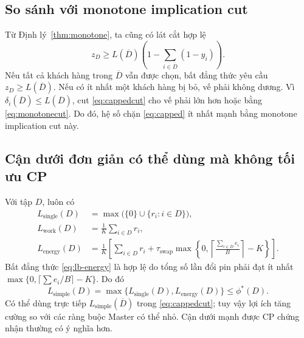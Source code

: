 \documentclass[11pt,a4paper]{article}
\theoremstyle{definition}
\theoremstyle{plain}
\theoremstyle{remark}
\newcommand{\sw}{\tau_{\mathrm{swap}}}
\newcommand{\opt}{\phi^*}
\newcommand{\barD}{\overline D}
\begin{document}
\subsection{So sánh với monotone implication cut}
Từ Định lý~\ref{thm:monotone}, ta cũng có lát cắt hợp lệ
\begin{equation}\label{eq:monotonecut}
z_D\ge L(\barD)\left(1-\sum_{i\in\barD}(1-y_i)\right).
\end{equation}
Nếu tất cả khách hàng trong $\barD$ vẫn được chọn, bất đẳng thức yêu cầu $z_D\ge L(\barD)$. Nếu có ít nhất một khách hàng bị bỏ, vế phải không dương. Vì $\delta_i(\barD)\le L(\barD)$, cut \eqref{eq:cappedcut} cho vế phải lớn hơn hoặc bằng \eqref{eq:monotonecut}. Do đó, hệ số chặn \eqref{eq:capped} ít nhất mạnh bằng monotone implication cut này.

\subsection{Cận dưới đơn giản có thể dùng mà không tối ưu CP}
Với tập $D$, luôn có
\begin{align}
L_{\mathrm{single}}(D)&=\max\bigl(\{0\}\cup\{r_i:i\in D\}\bigr),\label{eq:lb-single}\\
L_{\mathrm{work}}(D)&=\frac1K\sum_{i\in D}r_i,\label{eq:lb-work}\\
L_{\mathrm{energy}}(D)&=\frac1K\left[\sum_{i\in D}r_i+
\sw\max\left\{0,\left\lceil\frac{\sum_{i\in D}e_i}{B}\right\rceil-K\right\}\right].\label{eq:lb-energy}
\end{align}
Bất đẳng thức \eqref{eq:lb-energy} là hợp lệ do tổng số lần đổi pin phải đạt ít nhất $\max\{0,\lceil\sum e_i/B\rceil-K\}$. Do đó
\begin{equation}\label{eq:lb-instant}
L_{\mathrm{simple}}(D)=\max\{L_{\mathrm{single}}(D),L_{\mathrm{energy}}(D)\}
\le\opt(D).
\end{equation}
Có thể dùng trực tiếp $L_{\mathrm{simple}}(\barD)$ trong \eqref{eq:cappedcut}; tuy vậy lợi ích tăng cường so với các ràng buộc Master có thể nhỏ. Cận dưới mạnh được CP chứng nhận thường có ý nghĩa hơn.
\end{document}
